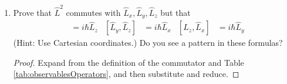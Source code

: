 \documentclass[../notes.tex]{subfiles}
\begin{document}
\begin{enumerate}[label={\textbf{6-\arabic*.}},ref={6-\arabic*}]
\begin{proof}[Answer]
\begin{align*}
            &= (1-x^2)\dv{x}\left( (1-x^2)\dv{P}{x} \right)+(\beta^2(1-x^2)-m^2)P(x)\\
            &= (1-x^2)\left[ (1-x^2)\dv[2]{P}{x}-2x\dv{P}{x} \right]+(\beta^2(1-x^2)-m^2)P(x)\\
            &= (1-x^2)\dv[2]{P}{x}-2x\dv{P}{x}+\left[ \beta^2-\frac{m^2}{1-x^2} \right]P(x)
        \end{align*}
    \end{proof}
    \setcounter{enumi}{12}
    \item \label{prb:6-13}Prove that $\hat{L}^2$ commutes with $\hat{L}_x,\hat{L}_y,\hat{L}_z$ but that
    \begin{align*}
        [\hat{L}_x,\hat{L}_y] &= i\hbar\hat{L}_z&
        [\hat{L}_y,\hat{L}_z] &= i\hbar\hat{L}_x&
        [\hat{L}_z,\hat{L}_x] &= i\hbar\hat{L}_y
    \end{align*}
    (Hint: Use Cartesian coordinates.) Do you see a pattern in these formulas?
    \begin{proof}
        Expand from the definition of the commutator and Table \ref{tab:observablesOperators}, and then substitute and reduce.
    \end{proof}
\end{enumerate}
\end{document}
